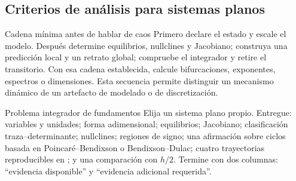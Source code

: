 \subsection*{Criterios de análisis para sistemas planos}

\begin{evidencebox}{Cadena mínima antes de hablar de caos}
Primero declare el estado y escale el modelo. Después determine equilibrios,
nullclines y Jacobiano; construya una predicción local y un retrato global; compruebe
el integrador y retire el transitorio. Con esa cadena establecida, calcule
bifurcaciones, exponentes, espectros o dimensiones. Esta secuencia permite
distinguir un mecanismo dinámico de un artefacto de modelado o de discretización.
\end{evidencebox}

\begin{activitybox}{Problema integrador de fundamentos}
Elija un sistema plano propio. Entregue: variables y unidades; forma adimensional;
equilibrios; Jacobiano; clasificación traza--determinante; nullclines; regiones de
signo; una afirmación sobre ciclos basada en Poincaré--Bendixson o Bendixson--Dulac;
cuatro trayectorias reproducibles en ; y una comparación con
\(h/2\). Termine con dos columnas: ``evidencia disponible'' y ``evidencia adicional requerida''.
\end{activitybox}
